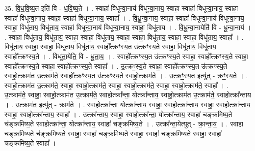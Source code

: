 \documentclass[17pt]{extarticle}
\begin{document}
35. वि॒ध॒वि॒ष्य॒त इति॑ वि - ध॒वि॒ष्य॒ते । . स्वाहा॑ विधून्वा॒नाय॑ विधून्वा॒नाय॒ स्वाहा॒ स्वाहा॑ विधून्वा॒नाय॒ स्वाहा॒ स्वाहा॑ विधून्वा॒नाय॒ स्वाहा॒ स्वाहा॑ विधून्वा॒नाय॒ स्वाहा᳚ । . वि॒धू॒न्वा॒नाय॒ स्वाहा॒ स्वाहा॑ विधून्वा॒नाय॑ विधून्वा॒नाय॒ स्वाहा॒ विधू॑ताय॒ विधू॑ताय॒ स्वाहा॑ विधून्वा॒नाय॑ विधून्वा॒नाय॒ स्वाहा॒ विधू॑ताय । . वि॒धू॒न्वा॒नायेति॑ वि - धू॒न्वा॒नाय॑ । . स्वाहा॒ विधू॑ताय॒ विधू॑ताय॒ स्वाहा॒ स्वाहा॒ विधू॑ताय॒ स्वाहा॒ स्वाहा॒ विधू॑ताय॒ स्वाहा॒ स्वाहा॒ विधू॑ताय॒ स्वाहा᳚ । . विधू॑ताय॒ स्वाहा॒ स्वाहा॒ विधू॑ताय॒ विधू॑ताय॒ स्वाहो᳚त्क्रꣳस्य॒त उ॑त्क्रꣳस्य॒ते स्वाहा॒ विधू॑ताय॒ विधू॑ताय॒ स्वाहो᳚त्क्रꣳस्य॒ते । . विधू॑ता॒येति॒ वि - धू॒ता॒य॒ । . स्वाहो᳚त्क्रꣳस्य॒त उ॑त्क्रꣳस्य॒ते स्वाहा॒ स्वाहो᳚त्क्रꣳस्य॒ते स्वाहा॒ स्वाहो᳚त्क्रꣳस्य॒ते स्वाहा॒ स्वाहो᳚त्क्रꣳस्य॒ते स्वाहा᳚ । . उ॒त्क्रꣳ॒॒स्य॒ते स्वाहा॒ स्वाहो᳚त्क्रꣳस्य॒त उ॑त्क्रꣳस्य॒ते स्वाहो॒त्क्राम॑त उ॒त्क्राम॑ते॒ स्वाहो᳚त्क्रꣳस्य॒त उ॑त्क्रꣳस्य॒ते स्वाहो॒त्क्राम॑ते । . उ॒त्क्रꣳ॒॒स्य॒त इत्यु॑त् - क्रꣳ॒॒स्य॒ते । . स्वाहो॒त्क्राम॑त उ॒त्क्राम॑ते॒ स्वाहा॒ स्वाहो॒त्क्राम॑ते॒ स्वाहा॒ स्वाहो॒त्क्राम॑ते॒ स्वाहा॒ स्वाहो॒त्क्राम॑ते॒ स्वाहा᳚ । . उ॒त्क्राम॑ते॒ स्वाहा॒ स्वाहो॒त्क्राम॑त उ॒त्क्राम॑ते॒ स्वाहोत्क्रा᳚न्ता॒ योत्क्रा᳚न्ताय॒ स्वाहो॒त्क्राम॑त उ॒त्क्राम॑ते॒ 
स्वाहोत्क्रा᳚न्ताय । . उ॒त्क्राम॑त॒ इत्यु॑त् - क्राम॑ते । . स्वाहोत्क्रा᳚न्ता॒ योत्क्रा᳚न्ताय॒ स्वाहा॒ स्वाहोत्क्रा᳚न्ताय॒ स्वाहा॒ स्वाहोत्क्रा᳚न्ताय॒ स्वाहा॒ स्वाहोत्क्रा᳚न्ताय॒ स्वाहा᳚ । . उत्क्रा᳚न्ताय॒ स्वाहा॒ स्वाहोत्क्रा᳚न्ता॒ योत्क्रा᳚न्ताय॒ स्वाहा॑ चङ्क्रमिष्य॒ते च॑ङ्क्रमिष्य॒ते स्वाहोत्क्रा᳚न्ता॒ 
योत्क्रा᳚न्ताय॒ स्वाहा॑ चङ्क्रमिष्य॒ते । . उत्क्रा᳚न्ता॒येत्युत् - क्रा॒न्ता॒य॒ । . स्वाहा॑ चङ्क्रमिष्य॒ते च॑ङ्क्रमिष्य॒ते स्वाहा॒ स्वाहा॑ चङ्क्रमिष्य॒ते स्वाहा॒ स्वाहा॑ चङ्क्रमिष्य॒ते स्वाहा॒ स्वाहा॑ चङ्क्रमिष्य॒ते स्वाहा᳚ । \newline
\end{document}
